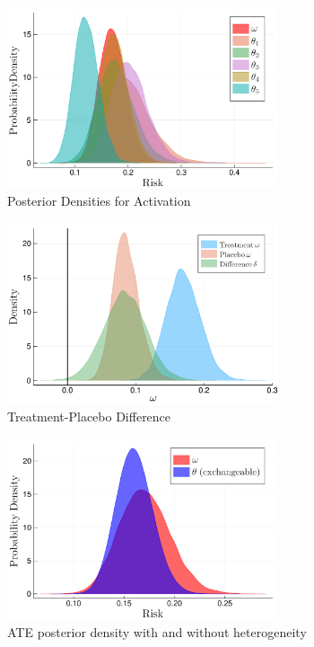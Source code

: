 \documentclass{juliacon}
\begin{document}
\begin{figure}[t]
	\centerline{\includegraphics[width=8cm]{thetas_omega.pdf}}
	\caption{Posterior Densities for Activation}
	\label{fig:activ}
\end{figure}

\begin{figure}[t]
	\centerline{\includegraphics[width=8cm]{treat_pbo_diff2.pdf}}
	\caption{Treatment-Placebo Difference}
	\label{fig:diff}
\end{figure}


\begin{table}
	\label{tab:delta_results}
\end{table}


\begin{figure}[t]
	\centerline{\includegraphics[width=8cm]{bhm_vs_exc.pdf}}
	\caption{ATE posterior density with and without heterogeneity}
	\label{fig:compare}	
\end{figure}
 
\end{document}
